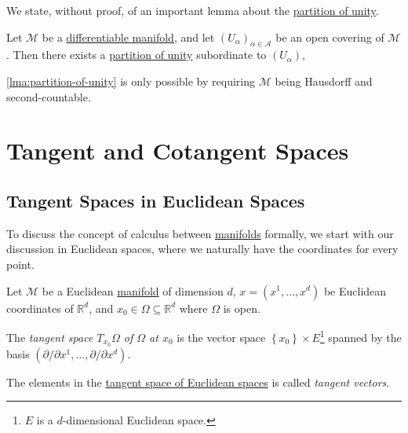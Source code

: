 We state, without proof, of an important lemma about the \hyperref[def:partition-of-unity]{partition of unity}.

\begin{lemma}\label{lma:partition-of-unity}
	Let \(\mathcal{M} \) be a \hyperref[def:smooth-manifold]{differentiable manifold}, and let \((U_\alpha )_{\alpha \in \mathcal{A} }\) be an open covering of \(\mathcal{M} \). Then there exists a \hyperref[def:partition-of-unity]{partition of unity} subordinate to \((U_\alpha )\),
\end{lemma}

\begin{remark}
	\autoref{lma:partition-of-unity} is only possible by requiring \(\mathcal{M} \) being Hausdorff and second-countable.
\end{remark}

\section{Tangent and Cotangent Spaces}
\subsection{Tangent Spaces in Euclidean Spaces}
To discuss the concept of calculus between \hyperref[def:smooth-manifold]{manifolds} formally, we start with our discussion in Euclidean spaces, where we naturally have the coordinates for every point.

\begin{definition*}
	Let \(\mathcal{M} \) be a Euclidean \hyperref[def:topological-manifold]{manifold} of dimension \(d\), \(x = (x^1, \dots , x^d)\) be Euclidean coordinates of \(\mathbb{R} ^d\), and \(x_0\in \Omega \subseteq \mathbb{R} ^d\) where \(\Omega \) is open.
	\begin{definition}\label{def:tangent-space-of-Euclidean-space}
		The \emph{tangent space \(T_{x_0}\Omega \) of \(\Omega \) at \(x_0\)} is the vector space \(\left\{ x_0 \right\} \times E\)\footnote{\(E\) is a \(d\)-dimensional Euclidean space.} spanned by the basis \((\partial / \partial x^1, \dots , \partial / \partial x^d)\).
	\end{definition}
	\begin{definition}\label{def:tangent-vector-of-Euclidean-space}
		The elements in the \hyperref[def:tangent-space-of-Euclidean-space]{tangent space of Euclidean spaces} is called \emph{tangent vectors}.
	\end{definition}
\end{definition*}

